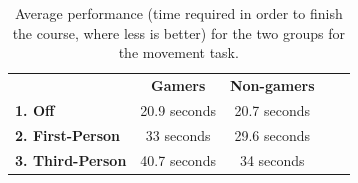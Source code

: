 \documentclass[runningheads,a4paper,oribibl]{llncs}
\begin{document}





\begin{table}[]
\centering
\setlength{\tabcolsep}{1em}
\def\arraystretch{1.8}
\begin{tabular}{l|c|cll}
                      & {\textbf{Gamers}} & {\textbf{Non-gamers}} &  &  \\ \cline{1-3}
\textbf{1. Off}          & 20.9 seconds                                    & 20.7 seconds                                          &  &  \\ \cline{1-3}
\textbf{2. First-Person} & 33 seconds                                   & 29.6 seconds                                        &  &  \\ \cline{1-3}
\textbf{3. Third-Person} & 40.7 seconds                                    & 34 seconds                                        &  & 
\end{tabular}
\caption{Average performance (time required in order to finish the course, where less is better) for the two groups for the movement task.}
\label{tab:Task3GraphP}
\end{table}



\end{document}
